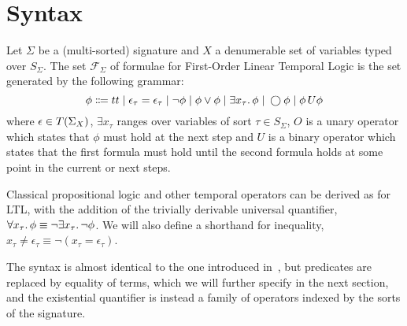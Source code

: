 \section{Syntax}

\begin{definition}
Let $\Sigma$ be a (multi-sorted) signature and $X$ a denumerable set of variables typed over $S_\Sigma$. The set
$\mathcal{F}_\Sigma$ of formulae for First-Order Linear Temporal Logic is the set generated by the following grammar:
\[
  \phi \Coloneqq tt \;|\; \epsilon_\tau = \epsilon_\tau
                    \;|\; \neg\phi
                    \;|\; \phi \lor \phi
                    \;|\; \exists {x_\tau} \ldotp {\phi}
                    \;|\; \bigcirc{\phi}
                    \;|\; {\phi}\,U {\phi}
\]
where $\epsilon \in T({\Sigma}_{X})$, $\exists x_\tau$ ranges over variables of sort $\tau \in S_\Sigma$,
$O$ is a unary operator which states that $\phi$ must hold at the next step and $U$ is a binary operator which states
that the first formula must hold until the second formula holds at some point in the current or next steps.
\end{definition}

Classical propositional logic and other temporal operators can be derived as for LTL, with the addition of the trivially
derivable universal quantifier, $\forall {x_\tau} \ldotp {\phi} \equiv \neg\exists {x_\tau} \ldotp {\neg\phi}$. We will also define a
shorthand for inequality, $x_\tau \neq \epsilon_\tau \equiv \neg(x_\tau = \epsilon_\tau)$.

The syntax is almost identical to the one introduced in~, but predicates are replaced by
equality of terms, which we will further specify in the next section, and the existential quantifier is instead a family
of operators indexed by the sorts of the signature.

